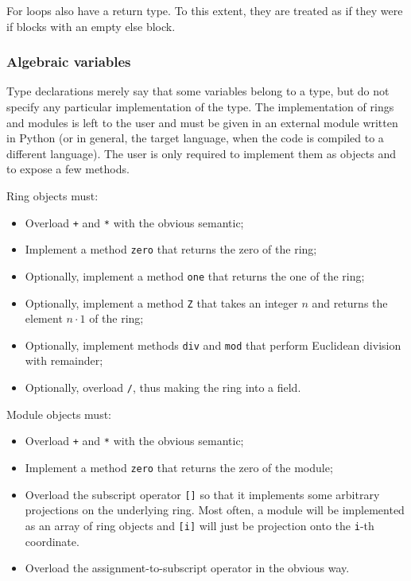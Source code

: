 For loops also have a return type. To this extent, they are treated as
if they were if blocks with an empty else block.



\subsubsection{Algebraic variables}
\label{sec:algebraicvar}
Type declarations merely say that some variables belong to a type, but
do not specify any particular implementation of the type. The
implementation of rings and modules is left to the user and must be
given in an external module written in Python (or in general, the
target language, when the code is compiled to a different
language). The user is only required to implement them as objects and
to expose a few methods.

Ring objects must:
\begin{itemize}
\item Overload \lstinline-+- and \lstinline+*+ with the obvious semantic;
\item Implement a method \lstinline-zero- that returns the zero of the ring;
\item Optionally, implement a method \lstinline-one- that returns the
  one of the ring;
\item Optionally, implement a method \lstinline-Z- that takes an
  integer $n$ and returns the element $n\cdot 1$ of the ring;
\item Optionally, implement methods \lstinline+div+ and
  \lstinline+mod+ that perform Euclidean division with remainder;
\item Optionally, overload \lstinline+/+, thus making the ring into a
  field.
\end{itemize}

Module objects must:
\begin{itemize}
\item Overload \lstinline-+- and \lstinline+*+ with the obvious semantic;
\item Implement a method \lstinline-zero- that returns the zero of the
  module;
\item Overload the subscript operator \lstinline+[]+ so that it
  implements some arbitrary projections on the underlying ring. Most
  often, a module will be implemented as an array of ring objects and
  \lstinline+[i]+ will just be projection onto the \lstinline+i+-th
  coordinate.
\item Overload the assignment-to-subscript operator in the obvious
  way.
\end{itemize}


